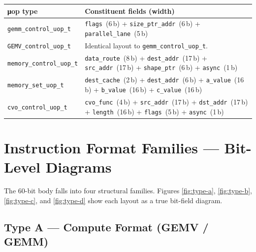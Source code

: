 \documentclass[11pt,a4paper,twoside,openany]{report}
\begin{document}
\begin{longtable}{|l|p{10cm}|}
\hline
\rowcolor{skytint}
\textbf{μop type} & \textbf{Constituent fields (width)} \\
\hline
\endfirsthead

\texttt{gemm\_control\_uop\_t}   & \texttt{flags}~(6\,b) + \texttt{size\_ptr\_addr}~(6\,b) + \texttt{parallel\_lane}~(5\,b) \\
\hline
\texttt{GEMV\_control\_uop\_t}   & Identical layout to \texttt{gemm\_control\_uop\_t}. \\
\hline
\texttt{memory\_control\_uop\_t} & \texttt{data\_route}~(8\,b) + \texttt{dest\_addr}~(17\,b) + \texttt{src\_addr}~(17\,b) + \texttt{shape\_ptr}~(6\,b) + \texttt{async}~(1\,b) \\
\hline
\texttt{memory\_set\_uop\_t}     & \texttt{dest\_cache}~(2\,b) + \texttt{dest\_addr}~(6\,b) + \texttt{a\_value}~(16\,b) + \texttt{b\_value}~(16\,b) + \texttt{c\_value}~(16\,b) \\
\hline
\texttt{cvo\_control\_uop\_t}    & \texttt{cvo\_func}~(4\,b) + \texttt{src\_addr}~(17\,b) + \texttt{dst\_addr}~(17\,b) + \texttt{length}~(16\,b) + \texttt{flags}~(5\,b) + \texttt{async}~(1\,b) \\
\hline
\end{longtable}

\section{Instruction Format Families — Bit-Level Diagrams}

The 60-bit body falls into four structural families. Figures
\ref{fig:type-a}, \ref{fig:type-b}, \ref{fig:type-c}, and
\ref{fig:type-d} show each layout as a true bit-field diagram.

\subsection{Type A --- Compute Format (GEMV / GEMM)}
\end{document}
